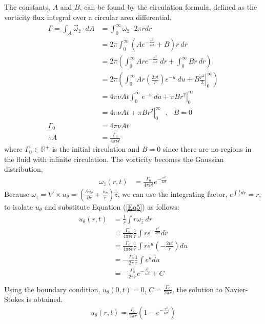 \documentclass{article}
\begin{document}
The constants, $A$ and $B$, can be found by the circulation formula, defined as the vorticity flux integral over a circular area differential.
\begin{align*}
    \Gamma = \int_A \vec{\omega}_{\hat{z}}\cdot dA &= \int_{0}^{\infty} \omega_{\hat{z}} \cdot 2\pi rdr \\
    &= 2\pi\int_{0}^{\infty} \left( A e^{-\frac{r^2}{4\nu t}}+B \right) r \: dr \\
    &= 2\pi \left( \int_{0}^{\infty} Ar e^{-\frac{r^2}{4\nu t}} \: dr +\int_{0}^{\infty} Br\:dr\right) \\
    &= 2\pi \left( \int_{0}^{\infty} Ar \left( \frac{2\nu t}{r}\right) e^{-u} \: du + \left. B\frac{r^2}{2}\right|_{0}^{\infty} \right) \\
    &= 4\pi \nu A t\int_{0}^{\infty} e^{-u} \: du + \pi \left. B r^2\right|_{0}^{\infty}  \\
    &= 4\pi \nu A t + \pi \left. B r^2\right|_{0}^{\infty} \:\:\:,\:\:\: B=0  \\
    \Gamma_0 &= 4\pi \nu A t \\
    \therefore A &= \frac{\Gamma_0}{4\pi \nu t}
\end{align*}
where $\Gamma_0 \in \mathbb{R}^+$ is the initial circulation and $B=0$ since there are no regions in the fluid with infinite circulation. The vorticity becomes the Gaussian distribution,
\begin{align}\label{Eq5}
    \omega_{\hat{z}}(r,t) &= \frac{\Gamma_0}{4\pi \nu t} e^{-\frac{r^2}{4\nu t}}
\end{align}
Because $\omega_{\hat{z}} = \nabla \times u_\theta =\left(\frac{\partial u_\theta}{\partial r}+\frac{u_\theta}{r}\right)\hat{z}$, we can use the integrating factor, $e^{\int \frac{1}{r} dr}=r$, to isolate $u_\theta$ and substitute Equation (\ref{Eq5}) as follows:
\begin{align}\label{Eq6}
\begin{split}
    u_\theta (r,t) &= \frac{1}{r}\int r\omega_{\hat{z}}\: dr \\
    &= \frac{\Gamma_0}{4\pi \nu t} \frac{1}{r}\int r e^{-\frac{r^2}{4\nu t}} dr \\
    &= \frac{\Gamma_0}{4\pi \nu t} \frac{1}{r}\int r e^{u} \left(-\frac{2\nu t}{r} \right) du \\
    &= -\frac{\Gamma_0}{2\pi} \frac{1}{r}\int e^{u} du \\
    &= -\frac{\Gamma_0}{2\pi r} e^{-\frac{r^2}{4\nu t}} +C \\
\end{split}
\end{align}
Using the boundary condition, $u_{\theta}(0,t)=0$, $C=\frac{\Gamma_0}{2\pi r}$, the solution to Navier-Stokes is obtained.
\begin{align*}
    u_\theta (r,t) = \frac{\Gamma_0}{2\pi r}\left( 1-e^{-\frac{r^2}{4\nu t}}\right) 
\end{align*}
\end{document}
